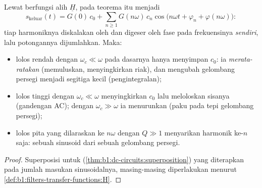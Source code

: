 \begin{proposition}\label{prop:b1:filters-transfer-functions:filtering}
Lewat  berfungsi alih $\underline H$,  pada teorema itu menjadi
\[
s_{\text{keluar}}(t) = G(0)\,c_0 + \sum_{n \geq 1} G(n\omega)\,c_n\cos\!\big(n\omega t + \varphi_n + \varphi(n\omega)\big):
\]
tiap harmoniknya diskalakan oleh  dan digeser oleh fase pada
frekuensinya \emph{sendiri}, lalu potongannya dijumlahkan. Maka:
\begin{itemize}
  \item lolos rendah dengan $\omega_c \ll \omega$ pada dasarnya hanya
        menyimpan $c_0$: ia \emph{merata-ratakan} (memuluskan,
        menyingkirkan riak), dan mengubah gelombang persegi menjadi
        segitiga kecil (pengintegralan);
  \item lolos tinggi dengan $\omega_c \ll \omega$ menyingkirkan $c_0$
        lalu meloloskan sisanya (gandengan AC); dengan
        $\omega_c \gg \omega$ ia menurunkan (paku pada tepi gelombang
        persegi);
  \item lolos pita yang dilaraskan ke $n\omega$ dengan $Q \gg 1$
        menyarikan harmonik ke-$n$ saja: sebuah sinusoid dari sebuah
        gelombang persegi.
\end{itemize}
\end{proposition}

\begin{proof}
Superposisi untuk  (\cref{thm:b1:dc-circuits:superposition})
yang diterapkan pada jumlah masukan sinusoidalnya, masing-masing
diperlakukan menurut \cref{def:b1:filters-transfer-functions:H}.
\end{proof}

